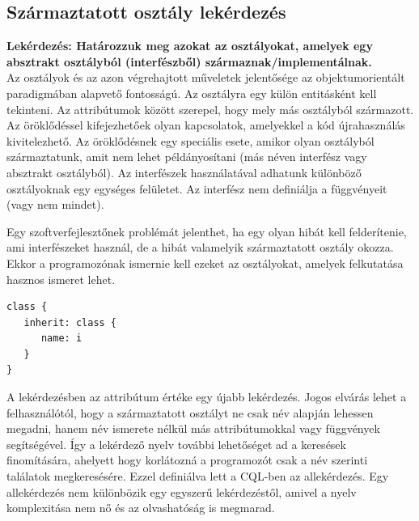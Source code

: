 \documentclass[a4paper,12pt]{report}
\begin{document}
\subsection{Származtatott osztály lekérdezés}
\textbf{Lekérdezés: Határozzuk meg azokat az osztályokat, amelyek egy absztrakt osztályból (interfészből) származnak/implementálnak.}
\\
Az osztályok és az azon végrehajtott műveletek jelentősége az objektumorientált paradigmában alapvető fontosságú. Az osztályra egy külön entitásként kell tekinteni. Az attribútumok között szerepel, hogy mely más osztályból származott. Az öröklődéssel kifejezhetőek olyan kapcsolatok, amelyekkel a kód újrahasználás kivitelezhető. Az öröklődésnek egy speciális esete, amikor olyan osztályból származtatunk, amit nem lehet példányosítani (más néven interfész vagy absztrakt osztályból). Az interfészek használatával adhatunk különböző osztályoknak egy egységes felületet. Az interfész nem definiálja a függvényeit (vagy nem mindet). 
\par Egy szoftverfejlesztőnek problémát jelenthet, ha egy olyan hibát kell felderítenie, ami interfészeket használ, de a hibát valamelyik származtatott osztály okozza. Ekkor a programozónak ismernie kell ezeket az osztályokat, amelyek felkutatása hasznos ismeret lehet.
\begin{verbatim}
class {
   inherit: class { 
      name: i 
   }
}
\end{verbatim}
\par A lekérdezésben az attribútum értéke egy újabb lekérdezés. Jogos elvárás lehet a felhasználótól, hogy a származtatott osztályt ne csak név alapján lehessen megadni, hanem név ismerete nélkül más attribútumokkal vagy függvények segítségével. Így a lekérdező nyelv további lehetőséget ad a keresések finomítására, ahelyett hogy korlátozná a programozót csak a név szerinti találatok megkeresésére. Ezzel definiálva lett a CQL-ben az allekérdezés. Egy allekérdezés nem különbözik egy egyszerű lekérdezéstől, amivel a nyelv komplexitása nem nő és az olvashatóság is megmarad. 
\end{document}
